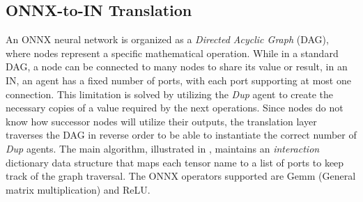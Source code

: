 \subsection{ONNX-to-IN Translation}
\label{sec:translation}

An ONNX neural network is organized as a \textit{Directed Acyclic Graph} (DAG), where nodes represent
a specific mathematical operation. While in a standard DAG, a node can be connected to many nodes to
share its value or result, in an IN, an agent has a fixed number of ports, with each port supporting
at most one connection. This limitation is solved by utilizing the \textit{Dup} agent to create the
necessary copies of a value required by the next operations. Since nodes do not know how successor
nodes will utilize their outputs, the translation layer traverses the DAG in reverse order
to be able to instantiate the correct number of \textit{Dup} agents. The main algorithm, illustrated
in \textbf{}, maintains an \textit{interaction} dictionary data structure that maps each tensor
name to a list of ports to keep track of the graph traversal. The ONNX operators supported are Gemm
(General matrix multiplication) and ReLU.

